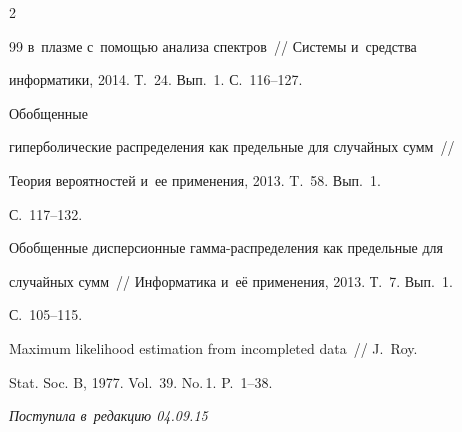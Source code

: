 \begin{multicols}{2}
{{\begin{thebibliography}{99}
в~плазме с~помощью анализа спектров~// Системы и~средства


информатики, 2014. Т.~24. Вып.~1. С.~116--127.







 Обобщенные


гиперболические распределения как предельные для случайных сумм~// 


Теория вероятностей и~ее применения, 2013. T.~58. Вып.~1.


С.~117--132.









Обобщенные дисперсионные гам\-ма-рас\-пре\-де\-ле\-ния как предельные для


случайных сумм~// Информатика и~её применения, 2013. Т.~7. Вып.~1.


С.~105--115.









Maximum likelihood estimation from incompleted data~// J.~Roy. 


Stat. Soc. B, 1977. Vol.~39. No.\,1. P.~1--38.


 \end{thebibliography}





 }


 }





\end{multicols}





\vspace*{-3pt}





\hfill{\small\textit{Поступила в~редакцию 04.09.15}}










